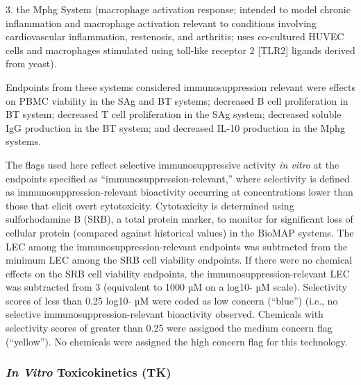 \documentclass[
  super,
  preprint,
  3p]{elsarticle}
\begin{document}
3. the Mphg System (macrophage activation response; intended to model
chronic inflammation and macrophage activation relevant to conditions
involving cardiovascular inflammation, restenosis, and arthritis; uses
co-cultured HUVEC cells and macrophages stimulated using toll-like
receptor 2 {[}TLR2{]} ligands derived from yeast).

Endpoints from these systems considered immunosuppression relevant were
effects on PBMC viability in the SAg and BT systems; decreased B cell
proliferation in BT system; decreased T cell proliferation in the SAg
system; decreased soluble IgG production in the BT system; and decreased
IL-10 production in the Mphg systems.

The flags used here reflect selective immunosuppressive activity
\emph{in vitro} at the endpoints specified as
``immunosuppression-relevant,'' where selectivity is defined as
immunosuppression-relevant bioactivity occurring at concentrations lower
than those that elicit overt cytotoxicity. Cytotoxicity is determined
using sulforhodamine B (SRB), a total protein marker, to monitor for
significant loss of cellular protein (compared against historical
values) in the BioMAP systems. The LEC among the
immunosuppression-relevant endpoints was subtracted from the minimum LEC
among the SRB cell viability endpoints. If there were no chemical
effects on the SRB cell viability endpoints, the
immunosuppression-relevant LEC was subtracted from 3 (equivalent to 1000
µM on a log10- µM scale). Selectivity scores of less than 0.25 log10- µM
were coded as low concern (``blue'') (i.e., no selective
immunosuppression-relevant bioactivity observed. Chemicals with
selectivity scores of greater than 0.25 were assigned the medium concern
flag (``yellow''). No chemicals were assigned the high concern flag for
this technology.

\hypertarget{in-vitro-toxicokinetics-tk}{%
\subsubsection{\texorpdfstring{\emph{In Vitro} Toxicokinetics
(TK)}{In Vitro Toxicokinetics (TK)}}\label{in-vitro-toxicokinetics-tk}}
\end{document}
